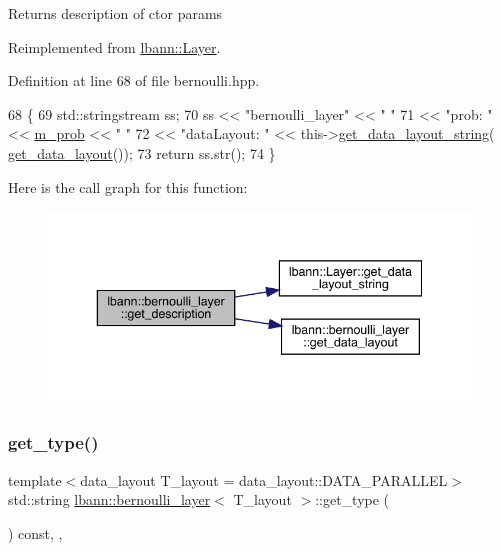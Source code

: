 Returns description of ctor params 

Reimplemented from \hyperlink{classlbann_1_1Layer_acc0803d3428914ca1eb5988c4309174a}{lbann\+::\+Layer}.



Definition at line 68 of file bernoulli.\+hpp.


\begin{DoxyCode}
68                                              \{
69     std::stringstream ss;
70     ss << \textcolor{stringliteral}{"bernoulli\_layer"} << \textcolor{stringliteral}{"  "}
71        << \textcolor{stringliteral}{"prob: "} << \hyperlink{classlbann_1_1bernoulli__layer_a4f4b68b455233b5e4c5c6f992289669c}{m\_prob} << \textcolor{stringliteral}{" "}
72        << \textcolor{stringliteral}{"dataLayout: "} << this->\hyperlink{classlbann_1_1Layer_ae3f4a5602df821f4221614b1e3782dc1}{get\_data\_layout\_string}(
      \hyperlink{classlbann_1_1bernoulli__layer_aad1be2449edaa224b44bb6cef47599e9}{get\_data\_layout}());
73      \textcolor{keywordflow}{return} ss.str();
74   \}
\end{DoxyCode}
Here is the call graph for this function\+:\nopagebreak
\begin{figure}[H]
\begin{center}
\leavevmode
\includegraphics[width=343pt]{classlbann_1_1bernoulli__layer_a9d46943959793d5ba5e5eebe26063dad_cgraph}
\end{center}
\end{figure}
\mbox{\label{classlbann_1_1bernoulli__layer_a077a9d4c6846e97c6d6f2614898d44b8}} 
\subsubsection{\texorpdfstring{get\+\_\+type()}{get\_type()}}
{\footnotesize\ttfamily template$<$data\+\_\+layout T\+\_\+layout = data\+\_\+layout\+::\+D\+A\+T\+A\+\_\+\+P\+A\+R\+A\+L\+L\+EL$>$ \\
std\+::string \hyperlink{classlbann_1_1bernoulli__layer}{lbann\+::bernoulli\+\_\+layer}$<$ T\+\_\+layout $>$\+::get\+\_\+type (\begin{DoxyParamCaption}{ }\end{DoxyParamCaption}) const\hspace{0.3cm}{\ttfamily [inline]}, {\ttfamily [override]}, {\ttfamily [virtual]}}


